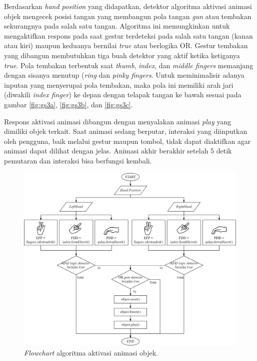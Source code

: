 			Berdasarkan \textit{hand position} yang didapatkan, detektor algoritma aktivasi animasi objek mengecek posisi tangan yang membangun pola tangan \textit{gun} atau tembakan sekurangnya pada salah satu tangan. Algoritma ini memungkinkan untuk mengaktifkan respons pada saat gestur terdeteksi pada salah satu tangan (kanan atau kiri) maupun keduanya bernilai \textit{true} atau berlogika OR. Gestur tembakan yang dibangun membutuhkan tiga buah detektor yang aktif ketika ketiganya \textit{true}. Pola tembakan terbentuk saat \textit{thumb}, \textit{index}, dan \textit{middle fingers} memanjang dengan sisanya menutup (\textit{ring} dan \textit{pinky fingers}.  Untuk meminimalisir adanya inputan yang menyerupai pola tembakan, maka pola ini memiliki arah jari (diwakili \textit{index finger}) ke depan dengan telapak tangan ke bawah sesuai pada gambar \ref{fig:gs3a}, \ref{fig:gs3b}, dan \ref{fig:gs3c}.
			
			Respons aktivasi animasi dibangun dengan menyalakan animasi \textit{play} yang dimiliki objek terkait. Saat animasi sedang berputar, interaksi yang diinputkan oleh pengguna, baik melalui gestur maupun tombol, tidak dapat diaktifkan agar animasi dapat dilihat dengan jelas. Animasi akhir berakhir setelah 5 detik pemutaran dan interaksi bisa berfungsi kembali.
			\begin{figure} [H]
				\includegraphics[width=\textwidth]{img/bab3/flow_animasi.png}
				\caption{\textit{Flowchart} algoritma aktivasi animasi objek.}
				\label{fig:flow_animasi}
			\end{figure}
			\vspace{-2ex}
		\vspace{0.75ex}
		
